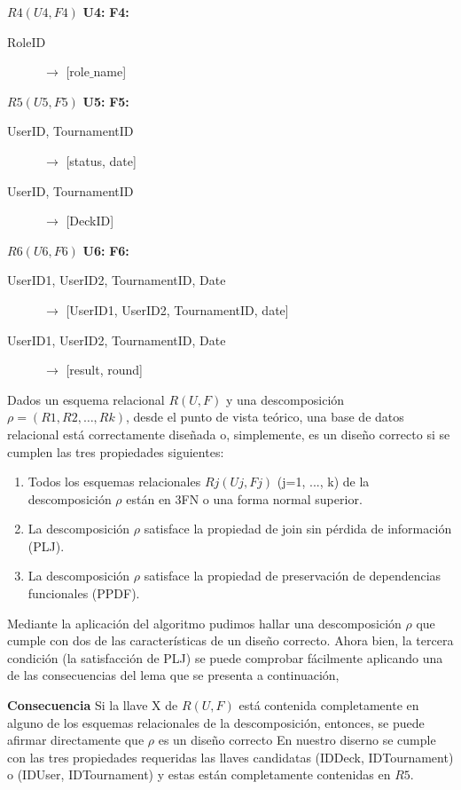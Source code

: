 \documentclass[a4paper]{article}
\begin{document}
$R4(U4,F4)$
\textbf{U4:}
\textbf{F4:}
\begin{description}
  \item[RoleID] $\rightarrow$ [role$\_$name]
\end{description}

$R5(U5,F5)$
\textbf{U5:}
\textbf{F5:}
\begin{description}
  \item[UserID, TournamentID] $\rightarrow$ [status, date]
  \item[UserID, TournamentID] $\rightarrow$ [DeckID]
\end{description}

$R6(U6,F6)$
\textbf{U6:}
\textbf{F6:}
\begin{description}
  \item[UserID1, UserID2, TournamentID, Date] $\rightarrow$ [UserID1, UserID2, TournamentID, date]
  \item[UserID1, UserID2, TournamentID, Date] $\rightarrow$ [result, round]
\end{description}

Dados un esquema relacional $R (U, F)$ y una descomposición $\rho = (R1, R2, \ldots, Rk)$, desde el punto de vista teórico, una base de datos relacional está correctamente diseñada o, simplemente, es un diseño correcto si se cumplen las tres propiedades siguientes: 
\begin{enumerate}
  \item Todos los esquemas relacionales $Rj (Uj, Fj)$ (j=1, ..., k) de la descomposición $\rho$ están en 3FN o una forma normal superior. 
  \item La descomposición $\rho$ satisface la propiedad de join sin pérdida de información (PLJ). 
  \item La descomposición $\rho$ satisface la propiedad de preservación de dependencias funcionales (PPDF).
\end{enumerate}

Mediante la aplicación del algoritmo pudimos hallar una descomposición $\rho$ que cumple con dos de las características de un diseño correcto. Ahora bien, la tercera condición (la satisfacción de PLJ) se puede comprobar fácilmente aplicando una de las consecuencias del lema que se presenta a continuación,

\textbf{Consecuencia} Si la llave X de $R (U, F)$ está contenida completamente en alguno de los esquemas relacionales de la descomposición, entonces, se puede afirmar directamente que $\rho$ es un diseño correcto 
En nuestro diserno se cumple con las tres propiedades requeridas las llaves candidatas (IDDeck, IDTournament) o (IDUser, IDTournament) y estas están completamente contenidas en $R5$.
\end{document}
